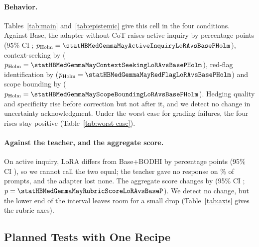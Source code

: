 \documentclass{article}
\newcommand{\bodhi}{BODHI}
\begin{document}
\paragraph{Behavior.} Tables~\ref{tab:main} and~\ref{tab:epistemic} give this cell in the four
conditions. Against Base, the adapter without CoT raises active inquiry by
\statHBMedGemmaMayActiveInquiryLoRAvsBaseDiff{} percentage points (95\% CI
\statHBMedGemmaMayActiveInquiryLoRAvsBaseCI; $p_{\text{Holm}} =
\statHBMedGemmaMayActiveInquiryLoRAvsBasePHolm$), context-seeking by
\statHBMedGemmaMayContextSeekingLoRAvsBaseDiff{} ($p_{\text{Holm}} =
\statHBMedGemmaMayContextSeekingLoRAvsBasePHolm$), red-flag identification by
\statHBMedGemmaMayRedFlagLoRAvsBaseDiff{} ($p_{\text{Holm}} = \statHBMedGemmaMayRedFlagLoRAvsBasePHolm$)
and scope bounding by \statHBMedGemmaMayScopeBoundingLoRAvsBaseDiff{} ($p_{\text{Holm}} =
\statHBMedGemmaMayScopeBoundingLoRAvsBasePHolm$). Hedging quality and specificity rise before
correction but not after it, and we detect no change in uncertainty acknowledgment. Under the worst
case for grading failures, the four rises stay positive (Table~\ref{tab:worst-case}).

\paragraph{Against the teacher, and the aggregate score.} On active inquiry, LoRA differs from
Base+\bodhi{} by \statHBMedGemmaMayActiveInquiryLoRAvsBaseBodhiDiff{} percentage points (95\% CI
\statHBMedGemmaMayActiveInquiryLoRAvsBaseBodhiCI), so we cannot call the two equal; the teacher gave
no response on \statHBMedGemmaMayCompletionDropPctBaseBodhi\% of prompts, and the adapter lost none.
The aggregate score changes by \statHBMedGemmaMayRubricScoreLoRAvsBaseDiff{} (95\% CI
\statHBMedGemmaMayRubricScoreLoRAvsBaseCI; $p = \statHBMedGemmaMayRubricScoreLoRAvsBaseP$). We detect no
change, but the lower end of the interval leaves room for a small drop (Table~\ref{tab:axis} gives
the rubric axes).

\subsection{Planned Tests with One Recipe}
\label{sec:rerun}

\begin{table}[t]
\centering
\caption{The plan's decision for each planned test and cell (Cell: prompts, base model,
teaching protocol). One recipe and one set of evaluation settings, except that a MedGemma-27B
reply can run to 4,096 tokens and the H6c cell uses a 4,096-token context with 1,024-token replies.
A difference is LoRA $-$ Base unless the row names another pair; for H3 it is the change in the
ask gap between the two versions of a MediQ case. $p$: Holm-adjusted over the seven dimensions for
active inquiry, and over the question's cells for H2, H3 and H7; the paired $t$ for H6 and H6c,
their precondition. pp: percentage points. Appendix~\ref{app:rerun} gives every test, E02 included.}
\label{tab:hypotheses}
\scriptsize
\setlength{\tabcolsep}{2pt}
\resizebox{\linewidth}{!}{}
\end{table}
\end{document}
